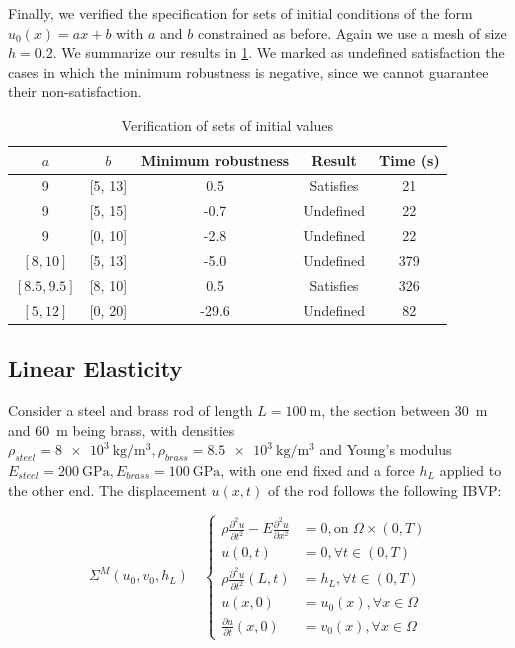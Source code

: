 \documentclass[letterpaper, 10 pt, conference]{ieeeconf/ieeeconf}
\begin{document}
Finally, we verified the specification for sets of initial conditions of the
form $u_0(x) = a x + b$ with $a$ and $b$ constrained as before. Again we use a
mesh of size $h = 0.2$. We summarize our results in \cref{tab:res_sets}. We
marked as undefined satisfaction the cases in which the minimum robustness is
negative, since we cannot guarantee their non-satisfaction.

\begin{table}
\caption{Verification of sets of initial values}
\label{tab:res_sets}
\centering
\begin{tabular}{|c|c|c|c|c|}
    \hline
    $a$ & $b$ & Minimum robustness & Result & Time (s)  \\
    \hline
    9 & [5, 13] & 0.5 & Satisfies & 21 \\
    9 & [5, 15] & -0.7 & Undefined & 22 \\
    9 & [0, 10] & -2.8 & Undefined & 22 \\
    $[8, 10]$ & [5, 13] & -5.0 & Undefined & 379 \\
    $[8.5, 9.5]$ & [8, 10] & 0.5 & Satisfies & 326 \\
    $[5, 12]$ & [0, 20] & -29.6 & Undefined & 82 \\
    \hline
\end{tabular}
\end{table}

\subsection{Linear Elasticity}
\label{sub:linear_elasticity}

Consider a steel and brass rod of length $L = \SI{100}{\m}$, the section between 
\SI{30}{\m} and \SI{60}{\m} being brass, with densities $\rho_{steel} =
\SI{8e3}{\kg\per\m^3}, \rho_{brass} = \SI{8.5e3}{\kg\per\m^3}$ and Young's
modulus $E_{steel} = \SI{200}{\giga\pascal}, E_{brass} =
\SI{100}{\giga\pascal}$,
with one end fixed and a force $h_L$ applied to the
other end. The displacement $u(x, t)$ of the rod follows the following IBVP:

\begin{equation}\label{eq:pde_mech}
    \Sigma^{M}(u_0, v_0, h_L) \quad \left \{
    \begin{aligned}
        \rho \frac{\partial^2 u}{\partial t^2} - E \frac{\partial^2
        u}{\partial x^2} &= 0, \text{on } \Omega \times (0, T) \\
        u(0, t) &= 0, \forall t \in (0, T) \\
        \rho \frac{\partial^2 u}{\partial t^2}(L, t) &= h_L, \forall t \in (0, T) \\
        u(x, 0) &= u_0(x), \forall x \in \Omega \\
        \frac{\partial u}{\partial t}(x, 0) &= v_0(x), \forall x \in \Omega
    \end{aligned}
    \right.
\end{equation}
\end{document}
